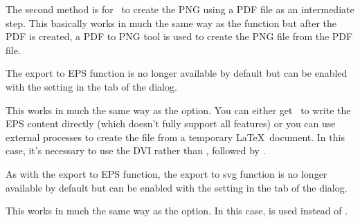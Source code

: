 \begin{deflist}
\begin{itemdesc}
The second method is for \FlowframTk\ to create the PNG using a PDF
file as an intermediate step. This basically works in much the same
way as the  function but after the PDF is
created, a PDF to PNG tool is used to create the PNG file from the
PDF file.
\end{itemdesc}


\begin{itemdesc}
The export to EPS function is no longer available by default but can
be enabled with the  setting in 
the  tab of the  dialog.

This works in much the same way as the  option.
You can either get \FlowframTk\ to write the EPS content directly
(which doesn't fully support all features) or you can use external
processes to create the file from a temporary \LaTeX\ document.
In this case, it's necessary to use the DVI  rather than
, followed by .
\end{itemdesc}


\begin{itemdesc}
As with the export to EPS function, the export to \gls{svg} function is no
longer available by default but can be enabled with the
 setting in the
 tab of the  dialog.

This works in much the same way as the  option.
In this case,  is used instead of .
\end{itemdesc}

\end{deflist}



